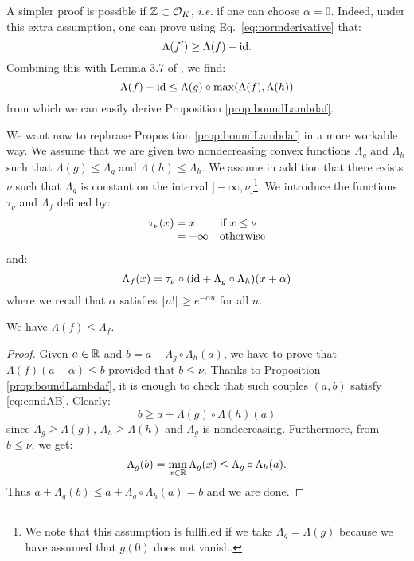 \documentclass{sig-alternate}
\begin{document}
\begin{rem}
A simpler proof is possible if $\mathbb Z \subset \mathcal O_K$, \emph{i.e.} if
one can choose $\alpha = 0$. Indeed, under this extra assumption,
one can prove using Eq.~\eqref{eq:normderivative} that:
$$\Lambda(f') \geq \Lambda(f) - \textrm{id}.$$
Combining this with Lemma 3.7 of \cite{padicprec}, we find:
$$\Lambda(f) - \textrm{id} \leq \Lambda(g) \circ \max(\Lambda(f), \Lambda(h))$$
from which we can easily derive Proposition \ref{prop:boundLambdaf}.
\end{rem}

We want now to rephrase Proposition \ref{prop:boundLambdaf} in a more 
workable way. We assume that we are given two nondecreasing convex 
functions $\Lambda_g$ and $\Lambda_h$ such that $\Lambda(g) \leq 
\Lambda_g$ and $\Lambda(h) \leq \Lambda_h$. We assume in addition that 
there exists $\nu$ such that $\Lambda_g$ is constant on the interval 
$]{-}\infty, \nu]$\footnote{We note that this assumption is fullfiled if 
we take $\Lambda_g = \Lambda(g)$ because we have assumed that $g(0)$ 
does not vanish.}. We introduce the functions $\tau_\nu$ and $\Lambda_f$ 
defined by:
$$\begin{array}{ll}
\tau_\nu(x) = x & \text{if } x \leq \nu \\
\hphantom{\tau_\nu(x)} = {+} \infty & \text{otherwise}
\end{array}$$
and:
$$\Lambda_f(x) = 
  \tau_\nu \circ (\textrm{id} + \Lambda_g \circ \Lambda_h)(x + \alpha)$$
where we recall that $\alpha$ satisfies $\Vert n! \Vert \geq e^{-\alpha 
n}$ for all $n$.

\begin{cor}
\label{cor:boundLambdaf}
We have $\Lambda(f) \leq \Lambda_f$.
\end{cor}

\begin{proof}
Given $a \in \mathbb R$ and $b = a + \Lambda_g \circ \Lambda_h(a)$, we have to 
prove that $\Lambda(f)(a-\alpha) \leq b$ provided that $b \leq \nu$. 
Thanks to Proposition \ref{prop:boundLambdaf}, it is enough to check 
that such couples $(a,b)$ satisfy \eqref{eq:condAB}. Clearly:
$$b \geq a + \Lambda(g) \circ \Lambda(h)(a)$$
since $\Lambda_g \geq \Lambda(g)$, $\Lambda_h \geq \Lambda(h)$ and
$\Lambda_g$ is nondecreasing. Furthermore, from $b \leq \nu$, we get:
$$\Lambda_g(b) = \min_{x \in \mathbb R} \Lambda_g(x) \leq \Lambda_g \circ 
\Lambda_h(a).$$
Thus $a + \Lambda_g(b) \leq a + \Lambda_g \circ \Lambda_h(a) =
b$ and we are done.
\end{proof}
\end{document}
